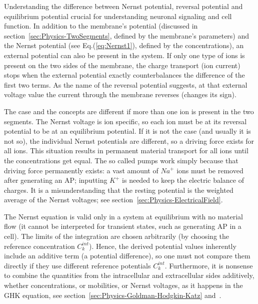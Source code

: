 Understanding the difference between Nernst potential, reversal potential and equilibrium potential crucial for understanding neuronal signaling and cell function.
In addition to the membrane's potential (discussed in section~\ref{sec:Physics-TwoSegments}, defined by the membrane's parameters) and the Nernst potential (see Eq.(\ref{eq:Nernst1}), defined by the concentrations),
an external potential can also be present in the system.
If only one type of ions is present on the two sides of the membrane, the charge transport (ion current) stops when the external potential exactly counterbalances the difference of the first two terms.
As the name of the reversal potential suggests, at that external voltage value the current through the membrane reverses (changes its sign).

The case and the concepts are different if more than one ion is present
in the two segments. The Nernst voltage is ion specific, so each ion must be at its reversal potential to be at an equilibrium potential.
If it is not the case (and usually it is not so), the individual Nernst potentials are different, so a driving force exists for all ions.
This situation results in permanent material transport for all ions
until the concentrations get equal. The so called pumps work
simply because that driving force permanently exists: a vast amount of 
$Na^+$ ions must be removed after generating an \gls{AP}; inputting
$K^+$ is needed to keep the electric balance of charges.
It is a misunderstanding that the resting potential is the weighted average of the Nernst voltages; see section~\ref{sec:Physics-ElectricalField}.
 


 

The Nernst equation is valid only in a system 
at equilibrium with no material flow (it cannot be interpreted for transient states, such as generating \gls{AP} in a cell).
The limits of the integration are chosen arbitrarily (by choosing the reference concentration $C_{k}^{int}$).
Hence, the derived potential values inherently include an additive term (a potential difference), so one must not compare them directly if they use different reference potentials $C_{k}^{int}$.
Furthermore, it is nonsense to combine the quantities from the intracellular and extracellular sides additively,
whether concentrations, or mobilities, or Nernst voltages, as it happens in the \gls{GHK} equation, see section~\ref{sec:Physics-Goldman-Hodgkin-Katz} and~\cite{VeghUnifiedCrossdisciplinaryModel:2026}.


